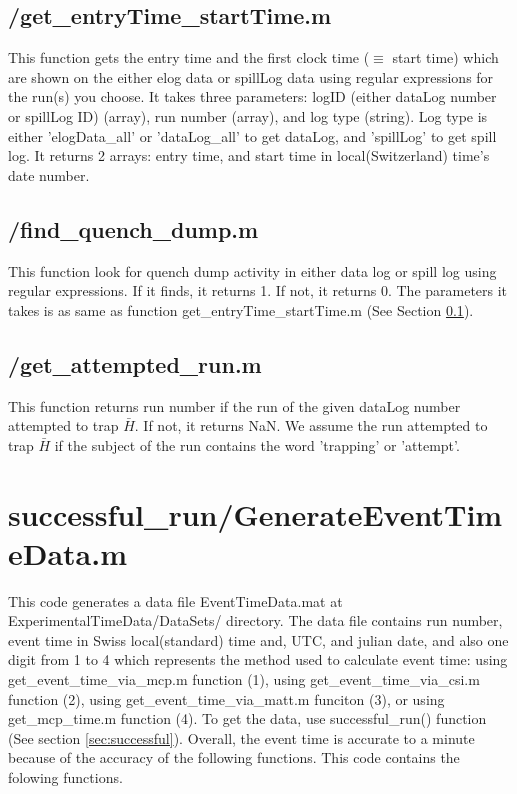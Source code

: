\documentclass[12pt]{report}
\begin{document}
\subsection{/get\_entryTime\_startTime.m}
\label{subsec:getentrytime}
This function gets the entry time and the first clock time ($\equiv$ start time) which are shown on the either elog data or spillLog data using regular expressions for the run(s) you choose. It takes three parameters: logID (either dataLog number or spillLog ID) (array), run number (array), and log type (string). Log type is either 'elogData\_all' or 'dataLog\_all' to get dataLog, and 'spillLog' to get spill log. It returns 2 arrays: entry time, and start time in local(Switzerland) time's date number.

\subsection{/find\_quench\_dump.m}
This function look for quench dump activity in either data log or spill log using regular expressions. If it finds, it returns 1. If not, it returns 0. The parameters it takes is as same as function get\_entryTime\_startTime.m (See Section \ref{subsec:getentrytime}). 

\subsection{/get\_attempted\_run.m}
This function returns run number if the run of the given dataLog number attempted to trap $\bar{H}$. If not, it returns NaN. We assume the run attempted to trap $\bar{H}$ if the subject of the run contains the word 'trapping' or 'attempt'.


\section{successful\_run/GenerateEventTimeData.m}
This code generates a data file EventTimeData.mat at ExperimentalTimeData/DataSets/ directory. The data file contains run number, event time in Swiss local(standard) time and, UTC, and julian date, and also one digit from 1 to 4 which represents the method used to calculate event time: using get\_event\_time\_via\_mcp.m function (1), using get\_event\_time\_via\_csi.m function (2), using get\_event\_time\_via\_matt.m funciton (3), or using get\_mcp\_time.m function (4). To get the data, use successful\_run() function (See section \ref{sec:successful}). Overall, the event time is accurate to a minute because of the accuracy of the following functions. This code contains the folowing functions.
\end{document}

